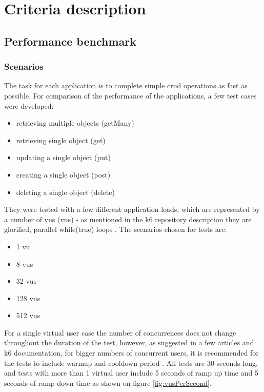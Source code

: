 
\chapter{Criteria description}

\section{Performance benchmark}

\subsection{Scenarios}\label{sub:scenarios}
The task for each application is to complete simple \acrshort{crud} operations as fast as possible. For comparison of the performance of the applications, a few test cases were developed:

\begin{itemize}
  \item retrieving multiple objects (getMany)
  \item retrieving single object (get)
  \item updating a single object (put)
  \item creating a single object (post)
  \item deleting a single object (delete)
\end{itemize}

They were tested with a few different application loads, which are represented by a number of \acrlong{vu}s (\acrshort{vu}s) - as mentioned in the k6 repository description they are glorified, parallel while(true) loops \cite{k6Git}.
The scenarios chosen for tests are:
\begin{itemize}
  \item 1 \acrshort{vu}
  \item 8 \acrshort{vu}s
  \item 32 \acrshort{vu}s
  \item 128 \acrshort{vu}s
  \item 512 \acrshort{vu}s
\end{itemize}
For a single virtual user case the number of concurrences does not change throughout the duration of the test, however, as suggested in a few articles and k6 documentation, for bigger numbers of concurrent users, it is recommended for the tests to include warmup and cooldown period \cite{whyRampUp} \cite{importanceOfRampUp} \cite{k6LoadTesting}. All tests are 30 seconds long, and tests with more than 1 virtual user include 5 seconds of ramp up time and 5 seconds of ramp down time as shown on figure \ref{fig:vusPerSecond}.

